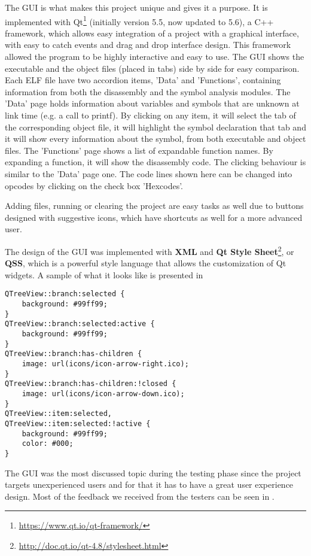 The GUI is what makes this project unique and gives it a purpose. It is implemented with Qt\footnote{\url{https://www.qt.io/qt-framework/}} (initially version 5.5, now updated to 5.6), a C++ framework, which allows easy integration of a project with a graphical interface, with easy to catch events and drag and drop interface design. This framework allowed the program to be highly interactive and easy to use. The GUI shows the executable and the object files (placed in tabs) side by side for easy comparison. Each ELF file have two accordion items, 'Data' and 'Functions', containing information from both the disassembly and the symbol analysis modules. The 'Data' page holds information about variables and symbols that are unknown at link time (e.g. a call to printf). By clicking on any item, it will select the tab of the corresponding object file, it will highlight the symbol declaration that tab and it will show every information about the symbol, from both executable and object files. The 'Functions' page shows a list of expandable function names. By expanding a function, it will show the disassembly code. The clicking behaviour is similar to the 'Data' page one. The code lines shown here can be changed into opcodes by clicking on the check box 'Hexcodes'.

Adding files, running or clearing the project are easy tasks as well due to buttons designed with suggestive icons, which have shortcuts as well for a more advanced user.

The design of the GUI was implemented with \textbf{XML} and \textbf{Qt Style Sheet}\footnote{\url{http://doc.qt.io/qt-4.8/stylesheet.html}}, or \textbf{QSS}, which is a powerful style language that allows the customization of Qt widgets. A sample of what it looks like is presented in 

\bigbreak
{}
\begin{lstlisting}
QTreeView::branch:selected {
	background: #99ff99;
}
QTreeView::branch:selected:active {
	background: #99ff99;
}
QTreeView::branch:has-children {
	image: url(icons/icon-arrow-right.ico);
}
QTreeView::branch:has-children:!closed {
	image: url(icons/icon-arrow-down.ico);
}
QTreeView::item:selected,
QTreeView::item:selected:!active {
	background: #99ff99;
	color: #000;
}
\end{lstlisting}

The GUI was the most discussed topic during the testing phase since the project targets unexperienced users and for that it has to have a great user experience design. Most of the feedback we received from the testers can be seen in .

